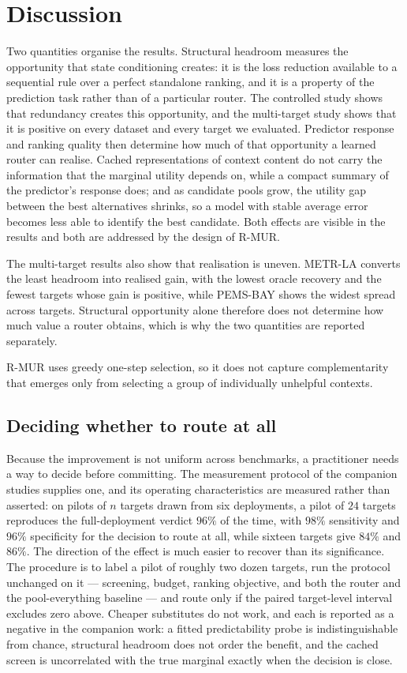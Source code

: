 \section{Discussion}

Two quantities organise the results. Structural headroom measures the
opportunity that state conditioning creates: it is the loss reduction available
to a sequential rule over a perfect standalone ranking, and it is a property of
the prediction task rather than of a particular router. The controlled study
shows that redundancy creates this opportunity, and the multi-target study
shows that it is positive on every dataset and every target we evaluated.
Predictor response and ranking quality then determine how much of that
opportunity a learned router can realise. Cached representations of context
content do not carry the information that the marginal utility depends on,
while a compact summary of the predictor's response does; and as candidate
pools grow, the utility gap between the best alternatives shrinks, so a model
with stable average error becomes less able to identify the best candidate.
Both effects are visible in the results and both are addressed by the design of
R-MUR.

The multi-target results also show that realisation is uneven. METR-LA converts
the least headroom into realised gain, with the lowest oracle recovery and the
fewest targets whose gain is positive, while PEMS-BAY shows the widest spread
across targets. Structural opportunity alone therefore does not determine how
much value a router obtains, which is why the two quantities are reported
separately.

R-MUR uses greedy one-step selection, so it does not capture complementarity
that emerges only from selecting a group of individually unhelpful contexts.
\subsection{Deciding whether to route at all}

Because the improvement is not uniform across benchmarks, a practitioner needs a
way to decide before committing. The measurement protocol of the companion
studies supplies one, and its operating characteristics are measured rather than
asserted: on pilots of $n$ targets drawn from six deployments, a pilot of $24$
targets reproduces the full-deployment verdict $96\%$ of the time, with $98\%$
sensitivity and $96\%$ specificity for the decision to route at all, while
sixteen targets give $84\%$ and $86\%$. The direction of the effect is much
easier to recover than its significance. The procedure is to label a pilot of
roughly two dozen targets, run the protocol unchanged on it --- screening,
budget, ranking objective, and both the router and the pool-everything baseline
--- and route only if the paired target-level interval excludes zero above.
Cheaper substitutes do not work, and each is reported as a negative in the
companion work: a fitted predictability probe is indistinguishable from chance,
structural headroom does not order the benefit, and the cached screen is
uncorrelated with the true marginal exactly when the decision is close.

